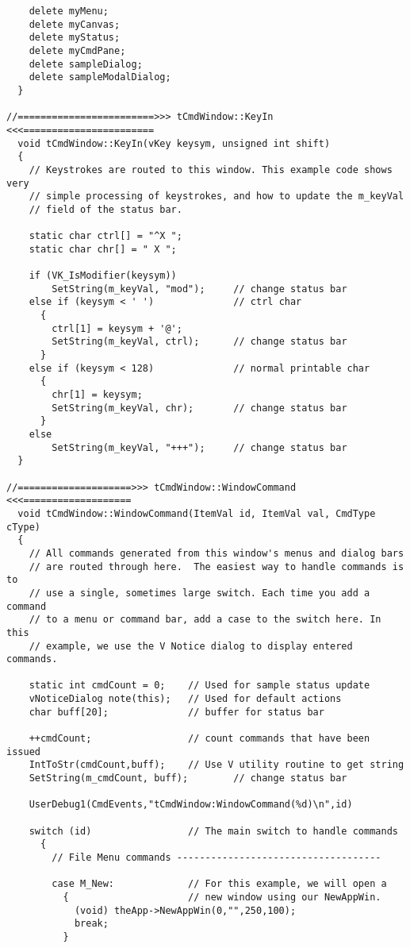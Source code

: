 \begin{verbatim}
    delete myMenu;
    delete myCanvas;
    delete myStatus;
    delete myCmdPane;
    delete sampleDialog;
    delete sampleModalDialog;
  }

//========================>>> tCmdWindow::KeyIn <<<=======================
  void tCmdWindow::KeyIn(vKey keysym, unsigned int shift)
  {
    // Keystrokes are routed to this window. This example code shows very
    // simple processing of keystrokes, and how to update the m_keyVal
    // field of the status bar.

    static char ctrl[] = "^X ";
    static char chr[] = " X ";

    if (VK_IsModifier(keysym))
        SetString(m_keyVal, "mod");     // change status bar
    else if (keysym < ' ')              // ctrl char
      {
        ctrl[1] = keysym + '@';
        SetString(m_keyVal, ctrl);      // change status bar
      }
    else if (keysym < 128)              // normal printable char
      {
        chr[1] = keysym;
        SetString(m_keyVal, chr);       // change status bar
      }
    else 
        SetString(m_keyVal, "+++");     // change status bar
  }

//====================>>> tCmdWindow::WindowCommand <<<===================
  void tCmdWindow::WindowCommand(ItemVal id, ItemVal val, CmdType cType)
  {
    // All commands generated from this window's menus and dialog bars
    // are routed through here.  The easiest way to handle commands is to
    // use a single, sometimes large switch. Each time you add a command
    // to a menu or command bar, add a case to the switch here. In this
    // example, we use the V Notice dialog to display entered commands.

    static int cmdCount = 0;    // Used for sample status update
    vNoticeDialog note(this);   // Used for default actions
    char buff[20];              // buffer for status bar

    ++cmdCount;                 // count commands that have been issued
    IntToStr(cmdCount,buff);    // Use V utility routine to get string
    SetString(m_cmdCount, buff);        // change status bar

    UserDebug1(CmdEvents,"tCmdWindow:WindowCommand(%d)\n",id)

    switch (id)                 // The main switch to handle commands
      {
        // File Menu commands ------------------------------------

        case M_New:             // For this example, we will open a
          {                     // new window using our NewAppWin.
            (void) theApp->NewAppWin(0,"",250,100);
            break;
          }


\end{verbatim}
